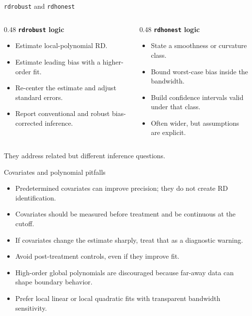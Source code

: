 \documentclass[aspectratio=169,11pt]{beamer}
\newcommand{\1}{\mathbf{1}}
\begin{document}
\begin{frame}{\texttt{rdrobust} and \texttt{rdhonest}}
\begin{columns}[T,onlytextwidth]
\begin{column}{0.48\linewidth}
\textbf{\texttt{rdrobust} logic}
\begin{itemize}
    \item Estimate local-polynomial RD.
    \item Estimate leading bias with a higher-order fit.
    \item Re-center the estimate and adjust standard errors.
    \item Report conventional and robust bias-corrected inference.
\end{itemize}
\end{column}
\begin{column}{0.48\linewidth}
\textbf{\texttt{rdhonest} logic}
\begin{itemize}
    \item State a smoothness or curvature class.
    \item Bound worst-case bias inside the bandwidth.
    \item Build confidence intervals valid under that class.
    \item Often wider, but assumptions are explicit.
\end{itemize}
\end{column}
\end{columns}

\medskip
They address related but different inference questions.
\end{frame}

\begin{frame}{Covariates and polynomial pitfalls}
\begin{itemize}
    \item Predetermined covariates can improve precision; they do not create RD identification.
    \item Covariates should be measured before treatment and be continuous at the cutoff.
    \item If covariates change the estimate sharply, treat that as a diagnostic warning.
    \item Avoid post-treatment controls, even if they improve fit.
    \item High-order global polynomials are discouraged because far-away data can shape boundary behavior.
    \item Prefer local linear or local quadratic fits with transparent bandwidth sensitivity.
\end{itemize}
\end{frame}
\end{document}
